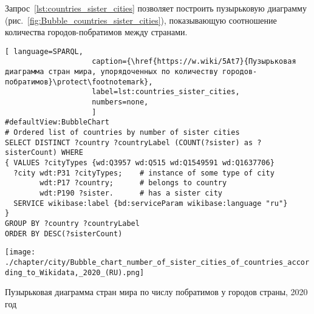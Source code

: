 Запрос~\ref{lst:countries_sister_cities} позволяет построить 
пузырьковую диаграмму (рис.~\ref{fig:Bubble_countries_sister_cities}), 
показывающую соотношение количества городов-побратимов между странами.


\begin{lstlisting}[ language=SPARQL, 
                    caption={\href{https://w.wiki/5At7}{Пузырьковая диаграмма стран мира, упорядоченных по количеству городов-побратимов}\protect\footnotemark},
                    label=lst:countries_sister_cities,
                    numbers=none,
                    ]
#defaultView:BubbleChart
# Ordered list of countries by number of sister cities
SELECT DISTINCT ?country ?countryLabel (COUNT(?sister) as ?sisterCount) WHERE
{ VALUES ?cityTypes {wd:Q3957 wd:Q515 wd:Q1549591 wd:Q1637706}
  ?city wdt:P31 ?cityTypes;    # instance of some type of city
        wdt:P17 ?country;      # belongs to country
        wdt:P190 ?sister.      # has a sister city
  SERVICE wikibase:label {bd:serviceParam wikibase:language "ru"}
}
GROUP BY ?country ?countryLabel
ORDER BY DESC(?sisterCount)
\end{lstlisting}


\begin{marginfigure}[-1.1cm]
    \texttt{[image: ./chapter/city/Bubble\_chart\_number\_of\_sister\_cities\_of\_countries\_according\_to\_Wikidata,\_2020\_(RU).png]}
    \vspace{-12pt}
    \caption[Пузырьковая диаграмма стран мира по числу побратимов у городов, 2020 год.]
            {Пузырьковая диаграмма стран мира по числу побратимов у городов страны, 2020 год}%
    \label{fig:Bubble_countries_sister_cities}%
\end{marginfigure}



